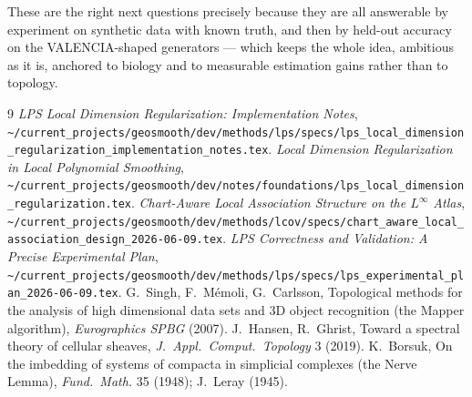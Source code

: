 \documentclass[11pt]{article}
\theoremstyle{definition}
\begin{document}
These are the right next questions precisely because they are all answerable by
experiment on synthetic data with known truth, and then by held-out accuracy on the
VALENCIA-shaped generators --- which keeps the whole idea, ambitious as it is,
anchored to biology and to measurable estimation gains rather than to topology.

\begin{thebibliography}{9}\small
{} \emph{LPS Local Dimension Regularization: Implementation Notes},
  \nolinkurl{~/current_projects/geosmooth/dev/methods/lps/specs/lps_local_dimension_regularization_implementation_notes.tex}.
 \emph{Local Dimension Regularization in Local Polynomial
  Smoothing}, \nolinkurl{~/current_projects/geosmooth/dev/notes/foundations/lps_local_dimension_regularization.tex}.
 \emph{Chart-Aware Local Association Structure on the
  $L^\infty$ Atlas},
  \nolinkurl{~/current_projects/geosmooth/dev/methods/lcov/specs/chart_aware_local_association_design_2026-06-09.tex}.
 \emph{LPS Correctness and Validation: A Precise Experimental Plan},
  \nolinkurl{~/current_projects/geosmooth/dev/methods/lps/specs/lps_experimental_plan_2026-06-09.tex}.
 G.~Singh, F.~M\'emoli, G.~Carlsson, Topological methods for the
  analysis of high dimensional data sets and 3D object recognition (the Mapper
  algorithm), \emph{Eurographics SPBG} (2007).
 J.~Hansen, R.~Ghrist, Toward a spectral theory of cellular
  sheaves, \emph{J.\ Appl.\ Comput.\ Topology} 3 (2019).
 K.~Borsuk, On the imbedding of systems of compacta in simplicial
  complexes (the Nerve Lemma), \emph{Fund.\ Math.} 35 (1948); J.~Leray (1945).
\end{thebibliography}
\end{document}

